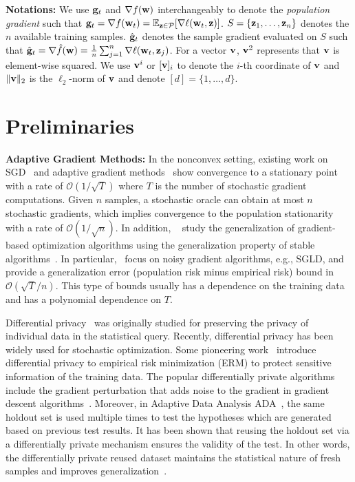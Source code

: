 \documentclass[11pt]{article}
\begin{document}
\textbf{Notations:} 
We use $\mathbf{g}_t$ and $\nabla f(\mathbf{w})$ interchangeably to denote the \emph{population gradient} such that $\g_t = \nabla f(\w_t) = \mathbb{E}_{\z \in \cP} [\nabla \ell(\w_t, \z)]$. 
$S = \left\{\mathbf{z}_{1}, \dots, \mathbf{z}_{n}\right\}$ denotes the $n$ available training samples. 
$\hat {\mathbf{g}}_t$ denotes the sample gradient evaluated on $S$ such that $\hat {\mathbf{g}}_t = \nabla \hat f(\mathbf{w}) = \frac{1}{n}\sum_{j=1}^n \nabla \ell(\mathbf{w}_t, \mathbf{z}_j)$. For a vector $\mathbf{v}$, $\mathbf{v}^2$ represents that $\mathbf{v}$ is element-wise squared.  
We use $\mathbf{v}^i$ or $[\mathbf{v}]_i$ to denote the $i$-th coordinate of $\mathbf{v}$ and $\|\mathbf{v}\|_2$ is the $\ell_2$-norm of $\mathbf{v}$ and denote $[d]=\{1,\dots,d\}$.


\section{Preliminaries}


{\bf Adaptive Gradient Methods:} 
In the nonconvex setting, existing work on SGD~\citep{ghla2013} and adaptive gradient methods~\citep{zare18, wawu19, zosh2019, cheli2019} show convergence to a stationary point with a rate of  $\mathcal{O}(1/\sqrt{T})$ where $T$ is the number of stochastic gradient computations. Given $n$ samples, a stochastic oracle can obtain at most $n$ stochastic gradients, which implies convergence to the population stationarity with a rate of $\mathcal{O}(1/\sqrt{n})$.
In addition, ~\citep{kula2018, rara2017, hare2016,mowa2018, pejo2018, cheli2019, lilu2019} study the generalization of gradient-based optimization algorithms using the generalization property of stable algorithms~\cite{boel02}. 
In particular,~\citep{rara2017, mowa2018, lilu2019, pejo2018} focus on noisy gradient algorithms, e.g., \textsc{SGLD}, and provide a generalization error (population risk minus empirical risk) bound in $\mathcal{O}(\sqrt{T}/n)$. 
This type of bounds usually has a dependence on the training data and has a polynomial dependence on $T$.  


Differential privacy~\cite{dwro2014} was originally studied for preserving the privacy of individual data in the statistical query. 
Recently, differential privacy has been widely used for stochastic optimization. 
Some pioneering work~\citep{chmo2011, basm2014, waye2017} introduce differential privacy to empirical risk minimization (ERM) to protect sensitive information of the training data. 
The popular differentially private algorithms include the gradient perturbation that adds noise to the gradient in gradient descent algorithms~\citep{chmo2011,basm2014,waxu2019}.
Moreover, in Adaptive Data Analysis \textsc{ADA}~\citep{dwfe2015a,dwfe2015b,dwfe2015c}, the same holdout set is used multiple times to test the hypotheses which are generated based on previous test results.
It has been shown that reusing the holdout set via a differentially private mechanism ensures the validity of the test. 
In other words, the differentially private reused dataset maintains the statistical nature of fresh samples and improves generalization~\citep{zhch2018}. 
\end{document}
